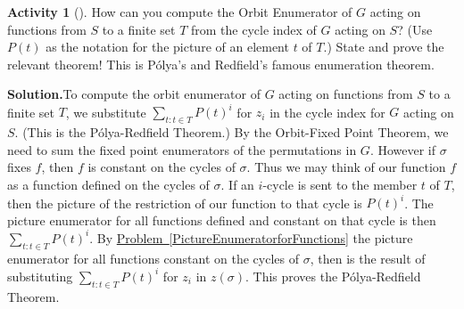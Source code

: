 \documentclass[10pt,]{book}
\theoremstyle{plain}
\theoremstyle{definition}
\newtheorem{activity}[project]{Activity}
\numberwithin{equation}{chapter}
\begin{document}
\begin{activity}[]\label{activity-313}
How can you compute the Orbit Enumerator of \(G\) acting on functions from \(S\) to a finite set \(T\) from the cycle index of \(G\) acting on \(S\)? (Use \(P(t)\) as the notation for the picture of an element \(t\) of \(T\).) State and prove the relevant theorem! This is Pólya's and Redfield's famous enumeration theorem.%
\par\medskip\noindent%
\textbf{Solution.}\quad To compute the orbit enumerator of \(G\) acting on functions from \(S\) to a finite set \(T\), we substitute \(\sum_{t:t\in T}P(t)^i\) for \(z_i\) in the cycle index for \(G\) acting on \(S\). (This is the Pólya-Redfield Theorem.) By the Orbit-Fixed Point Theorem, we need to sum the fixed point enumerators of the permutations in \(G\). However if \(\sigma\) fixes \(f\), then \(f\) is constant on the cycles of \(\sigma\). Thus we may think of our function \(f\) as a function defined on the cycles of \(\sigma\). If an \(i\)-cycle is sent to the member \(t\) of \(T\), then the picture of the restriction of our function to that cycle is \(P(t)^i\). The picture enumerator for all functions defined and constant on that cycle is then \(\sum_{t:t\in T} P(t)^i\). By \hyperref[PictureEnumeratorforFunctions]{Problem~\ref{PictureEnumeratorforFunctions}} the picture enumerator for all functions constant on the cycles of \(\sigma\), then is the result of substituting \(\sum_{t:t\in T}P(t)^i\) for \(z_i\) in \(z(\sigma)\). This proves the Pólya-Redfield Theorem.%
\end{activity}
\end{document}

